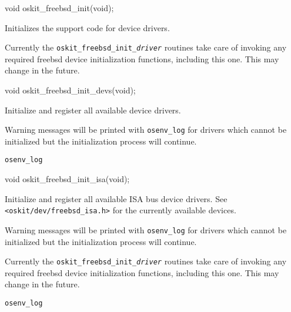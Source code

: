
\begin{apisyn}

	\funcproto void oskit_freebsd_init(void);
\end{apisyn}
\ostodrv
\begin{apidesc}
	Initializes the support code for \freebsd{} device drivers.

	Currently the {\tt oskit_freebsd_init_\emph{driver}} routines
	take care of invoking any required freebsd device initialization
	functions, including this one.  This may change	in the future.

\end{apidesc}

\begin{apisyn}

	\funcproto void oskit_freebsd_init_devs(void);
\end{apisyn}
\ostodrv
\begin{apidesc}
	Initialize and register all available \freebsd{} device drivers.

	Warning messages will be printed with {\tt osenv_log} for drivers
	which cannot be initialized but the initialization process will
	continue.
\end{apidesc}
\begin{apirel}
	{\tt osenv_log}
\end{apirel}

\begin{apisyn}

	\funcproto void oskit_freebsd_init_isa(void);
\end{apisyn}
\ostodrv
\begin{apidesc}
	Initialize and register all available \freebsd{} ISA bus device drivers.
	See {\tt <oskit/dev/freebsd_isa.h>} for the currently available
	devices.

	Warning messages will be printed with {\tt osenv_log} for drivers
	which cannot be initialized but the initialization process will
	continue.

	Currently the {\tt oskit_freebsd_init_\emph{driver}} routines
	take care of invoking any required freebsd device initialization
	functions, including this one.  This may change	in the future.
\end{apidesc}
\begin{apirel}
	{\tt osenv_log}
\end{apirel}

